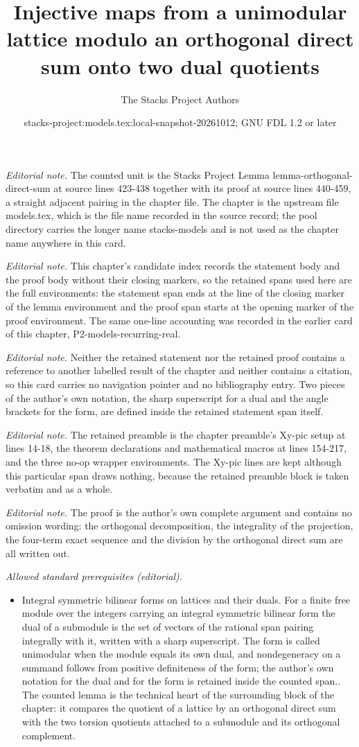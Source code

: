 \documentclass[10pt,a4paper]{amsart}
\title{Injective maps from a unimodular lattice modulo an orthogonal direct sum onto two dual quotients}
\author{The Stacks Project Authors}
\date{stacks-project:models.tex:local-snapshot-20261012; GNU FDL 1.2 or later}
\theoremstyle{plain}
\theoremstyle{definition}
\theoremstyle{remark}
\numberwithin{equation}{subsection}
\begin{document}
\maketitle
\noindent\textit{Editorial note.} The counted unit is the Stacks Project Lemma lemma-orthogonal-direct-sum at source lines 423-438 together with its proof at source lines 440-459, a straight adjacent pairing in the chapter file. The chapter is the upstream file models.tex, which is the file name recorded in the source record; the pool directory carries the longer name stacks-models and is not used as the chapter name anywhere in this card.\par\medskip
\noindent\textit{Editorial note.} This chapter's candidate index records the statement body and the proof body without their closing markers, so the retained spans used here are the full environments: the statement span ends at the line of the closing marker of the lemma environment and the proof span starts at the opening marker of the proof environment. The same one-line accounting was recorded in the earlier card of this chapter, P2-models-recurring-real.\par\medskip
\noindent\textit{Editorial note.} Neither the retained statement nor the retained proof contains a reference to another labelled result of the chapter and neither contains a citation, so this card carries no navigation pointer and no bibliography entry. Two pieces of the author's own notation, the sharp superscript for a dual and the angle brackets for the form, are defined inside the retained statement span itself.\par\medskip
\noindent\textit{Editorial note.} The retained preamble is the chapter preamble's Xy-pic setup at lines 14-18, the theorem declarations and mathematical macros at lines 154-217, and the three no-op wrapper environments. The Xy-pic lines are kept although this particular span draws nothing, because the retained preamble block is taken verbatim and as a whole.\par\medskip
\noindent\textit{Editorial note.} The proof is the author's own complete argument and contains no omission wording: the orthogonal decomposition, the integrality of the projection, the four-term exact sequence and the division by the orthogonal direct sum are all written out.\par\medskip
\noindent\textit{Allowed standard prerequisites (editorial).}\begin{itemize}
\item Integral symmetric bilinear forms on lattices and their duals. For a finite free module over the integers carrying an integral symmetric bilinear form the dual of a submodule is the set of vectors of the rational span pairing integrally with it, written with a sharp superscript. The form is called unimodular when the module equals its own dual, and nondegeneracy on a summand follows from positive definiteness of the form; the author's own notation for the dual and for the form is retained inside the counted span.. The counted lemma is the technical heart of the surrounding block of the chapter: it compares the quotient of a lattice by an orthogonal direct sum with the two torsion quotients attached to a submodule and its orthogonal complement.
\end{itemize}\medskip
\end{document}
